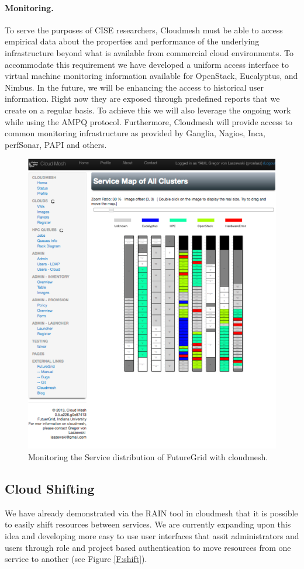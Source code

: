 \paragraph{Monitoring.}

To serve the purposes of CISE researchers, Cloudmesh must be able to access empirical data about the properties and performance of the underlying infrastructure beyond what is available from commercial cloud environments. To accommodate this requirement we have developed a uniform access interface to virtual machine monitoring information available for OpenStack, Eucalyptus, and Nimbus. In the future, we will be enhancing the access to historical user information. Right now they are exposed through predefined reports that we create on a regular basis. To achieve this we will also leverage the ongoing work while using the AMPQ protocol. Furthermore, Cloudmesh will provide access to common monitoring infrastructure as provided by Ganglia, Nagios, Inca, perfSonar, PAPI and others.

\begin{figure}[h!]
  \centering
    \includegraphics[width=.7\textwidth]{images/rainbow.pdf}
  \caption{Monitoring the Service distribution of FutureGrid with cloudmesh.}
\end{figure}

\subsection{Cloud Shifting}

We have already demonstrated via the RAIN tool in cloudmesh that it is
possible to easily shift resources between services. We are currently
expanding upon this idea and developing more easy to use user
interfaces that assit administrators and users through role and
project based authentication to move resources from one service to
another (see Figure \ref{F:shift}).

